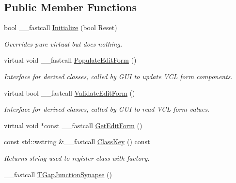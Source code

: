 \subsection*{Public Member Functions}
\begin{DoxyCompactItemize}
\item 
\hypertarget{class_t_gap_junction_synapse_ac390f959c2916d6ae385e3f01c796b30}{bool \+\_\+\+\_\+fastcall \hyperlink{class_t_gap_junction_synapse_ac390f959c2916d6ae385e3f01c796b30}{Initialize} (bool Reset)}\label{class_t_gap_junction_synapse_ac390f959c2916d6ae385e3f01c796b30}

\begin{DoxyCompactList}\small\item\em Overrides pure virtual but does nothing. \end{DoxyCompactList}\item 
\hypertarget{class_t_gap_junction_synapse_a989c5cef0289a16b63be18a6300ec64f}{virtual void \+\_\+\+\_\+fastcall \hyperlink{class_t_gap_junction_synapse_a989c5cef0289a16b63be18a6300ec64f}{Populate\+Edit\+Form} ()}\label{class_t_gap_junction_synapse_a989c5cef0289a16b63be18a6300ec64f}

\begin{DoxyCompactList}\small\item\em Interface for derived classes, called by G\+U\+I to update V\+C\+L form components. \end{DoxyCompactList}\item 
\hypertarget{class_t_gap_junction_synapse_af6fba5424b52b27f07553ecfde48f656}{virtual bool \+\_\+\+\_\+fastcall \hyperlink{class_t_gap_junction_synapse_af6fba5424b52b27f07553ecfde48f656}{Validate\+Edit\+Form} ()}\label{class_t_gap_junction_synapse_af6fba5424b52b27f07553ecfde48f656}

\begin{DoxyCompactList}\small\item\em Interface for derived classes, called by G\+U\+I to read V\+C\+L form values. \end{DoxyCompactList}\item 
virtual void $\ast$const \+\_\+\+\_\+fastcall \hyperlink{class_t_gap_junction_synapse_ad1bfccafcf7a340e61d76e9ffa340b63}{Get\+Edit\+Form} ()
\item 
const std\+::wstring \&\+\_\+\+\_\+fastcall \hyperlink{class_t_gap_junction_synapse_abe213c6289ba13e7ca700132fd3f9793}{Class\+Key} () const 
\begin{DoxyCompactList}\small\item\em Returns string used to register class with factory. \end{DoxyCompactList}\item 
\hypertarget{class_t_gap_junction_synapse_aed197bd35857a9933634533872edd262}{\+\_\+\+\_\+fastcall \hyperlink{class_t_gap_junction_synapse_aed197bd35857a9933634533872edd262}{T\+Gap\+Junction\+Synapse} ()}\label{class_t_gap_junction_synapse_aed197bd35857a9933634533872edd262}


\end{DoxyCompactItemize}
